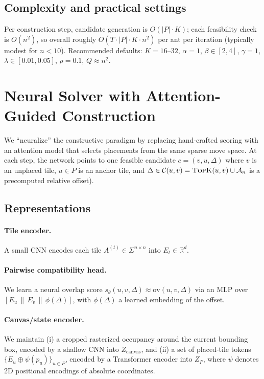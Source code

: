 \documentclass[11pt]{article}
\begin{document}
\subsection{Complexity and practical settings}
Per construction step, candidate generation is $O(|P|\cdot K)$; each feasibility check is $O(n^2)$, so overall roughly $O(T\cdot |P|\cdot K\cdot n^2)$ per ant per iteration (typically modest for $n<10$). Recommended defaults: $K=16\text{--}32$, $\alpha=1$, $\beta\in[2,4]$, $\gamma=1$, $\lambda\in[0.01,0.05]$, $\rho=0.1$, $Q\approx n^2$.

\section{Neural Solver with Attention-Guided Construction}
\label{sec:neural}

We ``neuralize'' the constructive paradigm by replacing hand-crafted scoring
with an attention model that selects placements from the same sparse move space.
At each step, the network points to one feasible candidate
$c=(v,u,\Delta)$ where $v$ is an unplaced tile, $u\in P$ is an anchor tile,
and $\Delta\in\mathcal{C}(u,v)=\textsc{TopK}(u,v)\cup\mathcal{A}_n$ is a precomputed
relative offset).

\subsection{Representations}
\paragraph{Tile encoder.}
A small CNN encodes each tile $A^{(t)}\in\Sigma^{n\times n}$ into
$E_t \in \mathbb{R}^d$.

\paragraph{Pairwise compatibility head.}
We learn a neural overlap score $s_\theta(u,v,\Delta)\approx \mathrm{ov}(u,v,\Delta)$
via an MLP over $[E_u\,\|\,E_v\,\|\,\phi(\Delta)]$,
with $\phi(\Delta)$ a learned embedding of the offset.

\paragraph{Canvas/state encoder.}
We maintain (i) a cropped rasterized occupancy around the current
bounding box, encoded by a shallow CNN into $Z_{\text{canvas}}$, and
(ii) a set of placed-tile tokens $\{E_u \oplus \psi(p_u)\}_{u\in P}$,
encoded by a Transformer encoder into $Z_P$, where $\psi$ denotes 2D
positional encodings of absolute coordinates.
\end{document}

